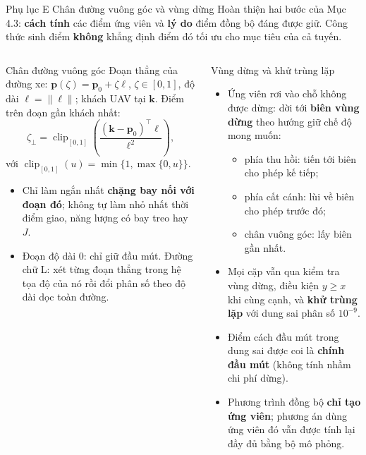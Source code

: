 \documentclass[aspectratio=169,10pt,t,xcolor={table}]{beamer}
\newcommand{\apptitle}[2]{Phụ lục #1 \textperiodcentered{} #2}
\begin{document}
\begin{frame}[label=appE]{\apptitle{E}{Chân đường vuông góc và vùng dừng}}
\footnotesize
Hoàn thiện hai bước của Mục 4.3: \textbf{cách tính} các điểm ứng viên và \textbf{lý do} điểm đồng bộ đáng được giữ. Công thức sinh điểm \textbf{không} khẳng định điểm đó tối ưu cho mục tiêu của cả tuyến.
\begin{columns}[T,onlytextwidth]
\begin{block}{Chân đường vuông góc}
\scriptsize Đoạn thẳng của đường xe: $\mathbf p(\zeta)=\mathbf p_0+\zeta\boldsymbol\ell$, $\zeta\in[0,1]$, độ dài $\ell=\|\boldsymbol\ell\|$; khách UAV tại $\mathbf k$. Điểm trên đoạn gần khách nhất:
\[
\zeta_\perp=\operatorname{clip}_{[0,1]}\left(\frac{(\mathbf k-\mathbf p_0)^\top\boldsymbol\ell}{\ell^2}\right),
\]
với $\operatorname{clip}_{[0,1]}(u)=\min\{1,\max\{0,u\}\}$.
\begin{itemize}
\item Chỉ làm ngắn nhất \textbf{chặng bay nối với đoạn đó}; không tự làm nhỏ nhất thời điểm giao, năng lượng có bay treo hay $J$.
\item Đoạn độ dài 0: chỉ giữ đầu mút. Đường chữ L: xét từng đoạn thẳng trong hệ tọa độ của nó rồi đổi phân số theo độ dài dọc toàn đường.
\end{itemize}
\end{block}
\begin{block}{Vùng dừng và khử trùng lặp}
\scriptsize
\begin{itemize}
\item Ứng viên rơi vào chỗ không được dừng: dời tới \textbf{biên vùng dừng} theo hướng giữ chế độ mong muốn:
  \begin{itemize}\scriptsize
  \item phía thu hồi: tiến tới biên cho phép kế tiếp;
  \item phía cất cánh: lùi về biên cho phép trước đó;
  \item chân vuông góc: lấy biên gần nhất.
  \end{itemize}
\item Mọi cặp vẫn qua kiểm tra vùng dừng, điều kiện $y\ge x$ khi cùng cạnh, và \textbf{khử trùng lặp} với dung sai phân số $10^{-9}$.
\item Điểm cách đầu mút trong dung sai được coi là \textbf{chính đầu mút} (không tính nhầm chi phí dừng).
\item Phương trình đồng bộ \textbf{chỉ tạo ứng viên}; phương án dùng ứng viên đó vẫn được tính lại đầy đủ bằng bộ mô phỏng.
\end{itemize}
\end{block}
\end{columns}
\end{frame}
\end{document}
